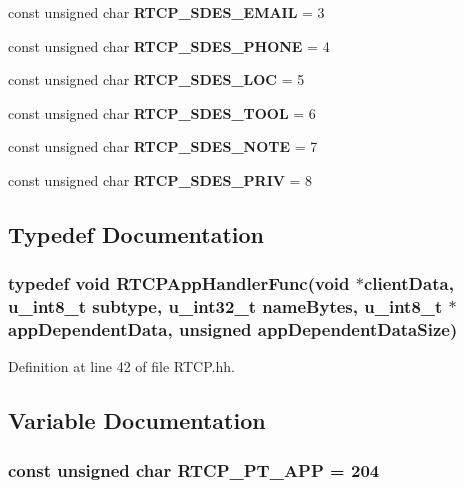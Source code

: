 \begin{DoxyCompactItemize}
\item 
const unsigned char {\bf R\+T\+C\+P\+\_\+\+S\+D\+E\+S\+\_\+\+E\+M\+A\+I\+L} = 3
\item 
const unsigned char {\bf R\+T\+C\+P\+\_\+\+S\+D\+E\+S\+\_\+\+P\+H\+O\+N\+E} = 4
\item 
const unsigned char {\bf R\+T\+C\+P\+\_\+\+S\+D\+E\+S\+\_\+\+L\+O\+C} = 5
\item 
const unsigned char {\bf R\+T\+C\+P\+\_\+\+S\+D\+E\+S\+\_\+\+T\+O\+O\+L} = 6
\item 
const unsigned char {\bf R\+T\+C\+P\+\_\+\+S\+D\+E\+S\+\_\+\+N\+O\+T\+E} = 7
\item 
const unsigned char {\bf R\+T\+C\+P\+\_\+\+S\+D\+E\+S\+\_\+\+P\+R\+I\+V} = 8
\end{DoxyCompactItemize}


\subsection{Typedef Documentation}
\subsubsection[{R\+T\+C\+P\+App\+Handler\+Func}]{\setlength{\rightskip}{0pt plus 5cm}typedef void R\+T\+C\+P\+App\+Handler\+Func(void $\ast$client\+Data, u\+\_\+int8\+\_\+t subtype, u\+\_\+int32\+\_\+t name\+Bytes, u\+\_\+int8\+\_\+t $\ast$app\+Dependent\+Data, unsigned app\+Dependent\+Data\+Size)}\label{RTCP_8hh_a23ebce89c523d43240405d6e46f6c41c}


Definition at line 42 of file R\+T\+C\+P.\+hh.



\subsection{Variable Documentation}
\subsubsection[{R\+T\+C\+P\+\_\+\+P\+T\+\_\+\+A\+P\+P}]{\setlength{\rightskip}{0pt plus 5cm}const unsigned char R\+T\+C\+P\+\_\+\+P\+T\+\_\+\+A\+P\+P = 204}\label{RTCP_8hh_a628a80a33270627d34904b133bbc4af2}


